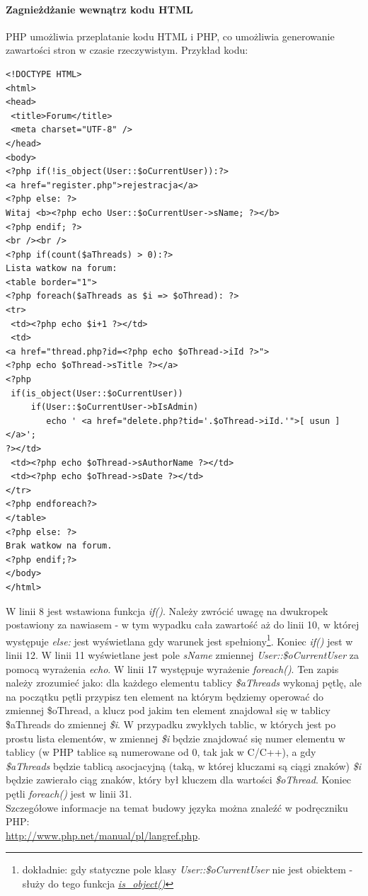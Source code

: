 \documentclass[a4paper,10pt]{article}
\begin{document}
\paragraph{Zagnieżdżanie wewnątrz kodu HTML} PHP umożliwia przeplatanie kodu HTML i PHP, co umożliwia generowanie zawartości stron w czasie rzeczywistym. Przykład kodu: \\
\begin{verbatim}
<!DOCTYPE HTML>
<html>
<head>
 <title>Forum</title>
 <meta charset="UTF-8" />
</head>
<body>
<?php if(!is_object(User::$oCurrentUser)):?>
<a href="register.php">rejestracja</a>
<?php else: ?>
Witaj <b><?php echo User::$oCurrentUser->sName; ?></b>
<?php endif; ?>
<br /><br />
<?php if(count($aThreads) > 0):?>
Lista watkow na forum:
<table border="1">
<?php foreach($aThreads as $i => $oThread): ?>
<tr>
 <td><?php echo $i+1 ?></td>
 <td>
<a href="thread.php?id=<?php echo $oThread->iId ?>">
<?php echo $oThread->sTitle ?></a>
<?php 
 if(is_object(User::$oCurrentUser))
	 if(User::$oCurrentUser->bIsAdmin)
	 	echo ' <a href="delete.php?tid='.$oThread->iId.'">[ usun ]</a>'; 
?></td>
 <td><?php echo $oThread->sAuthorName ?></td>
 <td><?php echo $oThread->sDate ?></td>
</tr>
<?php endforeach?>
</table>
<?php else: ?>
Brak watkow na forum.
<?php endif;?>
</body>
</html>
\end{verbatim}
W linii 8 jest wstawiona funkcja \textit{if()}. Należy zwrócić uwagę na dwukropek postawiony za nawiasem - w tym wypadku cała zawartość aż do linii 10, w której występuje \textit{else:} jest wyświetlana gdy warunek jest spełniony\footnote{dokładnie: gdy statyczne pole klasy \textit{User::\$oCurrentUser} nie jest obiektem - służy do tego funkcja \textit{\href{http://www.php.net/manual/en/function.is-object.php}{is\_object()}}}. Koniec \textit{if()} jest w linii 12. W linii 11 wyświetlane jest pole \textit{sName} zmiennej \textit{User::\$oCurrentUser} za pomocą wyrażenia \textit{echo}. W linii 17 występuje wyrażenie \textit{foreach()}. Ten zapis należy zrozumieć jako: dla każdego elementu tablicy \textit{\$aThreads} wykonaj pętlę, ale na początku pętli przypisz ten element na którym będziemy operować do zmiennej \$oThread, a klucz pod jakim ten element znajdował się w tablicy \$aThreads do zmiennej \textit{\$i}. W przypadku zwykłych tablic, w których jest po prostu lista elementów, w zmiennej \textit{\$i} będzie znajdować się numer elementu w tablicy (w PHP tablice są numerowane od 0, tak jak w C/C++), a gdy \textit{\$aThreads} będzie tablicą asocjacyjną (taką, w której kluczami są ciągi znaków) \textit{\$i} będzie zawierało ciąg znaków, który był kluczem dla wartości \textit{\$oThread}. Koniec pętli \textit{foreach()} jest w linii 31.\\ Szczegółowe informacje na temat budowy języka można znaleźć w podręczniku PHP: \\ \href{http://www.php.net/manual/pl/langref.php}{http://www.php.net/manual/pl/langref.php}.
\end{document}
